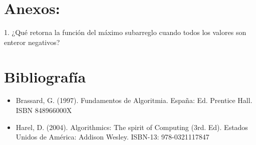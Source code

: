 \documentclass[spanish]{article}
\begin{document}
	\section{Anexos:}
	

	{\large 1.  ¿Qué retorna la función del máximo subarreglo cuando todos los valores son enteror negativos?}\\

	\bigskip

	\section{Bibliografía}
	\begin{itemize}
		\item Brassard, G. (1997). Fundamentos de Algoritmia. España: Ed. Prentice Hall. ISBN 		848966000X
		\item Harel, D. (2004). Algorithmics: The spirit of Computing (3rd. Ed). Estados Unidos de América: Addison
Wesley. ISBN-13: 978-0321117847
	\end{itemize}
\end{document}
